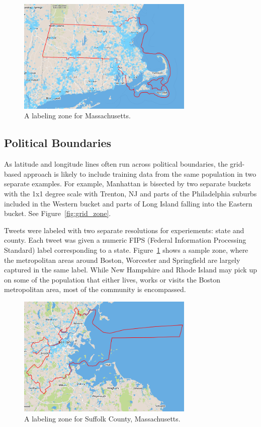 \documentclass[midd]{thesis}
\begin{document}
\begin{figure}
\centering
\includegraphics[width=0.75\textwidth]{state_zone.png}
\caption{A labeling zone for Massachusetts.}
\label{fig:state_zone}
\end{figure}

\subsection{Political Boundaries}
As latitude and longitude lines often run across political boundaries, the grid-based approach is likely to include training data from the same population in two separate examples. For example, Manhattan is bisected by two separate buckets with the 1x1 degree scale with Trenton, NJ and parts of the Philadelphia suburbs included in the Western bucket and parts of Long Island falling into the Eastern bucket. See Figure~\ref{fig:grid_zone}. 

Tweets were labeled with two separate resolutions for experiements: state and county. Each tweet was given a numeric FIPS (Federal Information Processing Standard) label corresponding to a state. Figure~\ref{fig:state_zone} shows a sample zone, where the metropolitan areas around Boston, Worcester and Springfield are largely captured in the same label. While New Hampshire and Rhode Island may pick up on some of the population that either lives, works or visits the Boston metropolitan area, most of the community is encompassed.

\begin{figure}
\centering
\includegraphics[width=0.75\textwidth]{county_zone.png}
\caption{A labeling zone for Suffolk County, Massachusetts.}
\label{fig:county_zone}
\end{figure}
\end{document}
